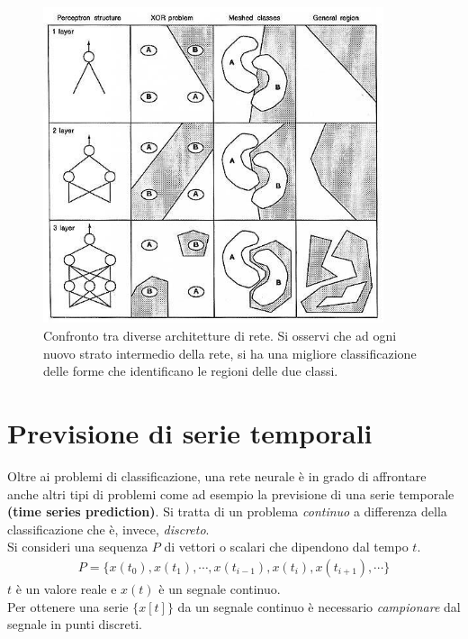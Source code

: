 \begin{figure}[h!]
	\centering
	\includegraphics[width=10cm]{images/layers}
	\caption[Confronto tra diverse architetture di rete]{Confronto tra diverse architetture di rete. Si osservi che ad ogni nuovo strato intermedio della rete, si ha una migliore classificazione delle forme che identificano le regioni delle due classi.}
\end{figure}



\section{Previsione di serie temporali} %
\label{sec:previsione_di_serie_temporali}
Oltre ai problemi di classificazione, una rete neurale è in grado di affrontare anche altri tipi di problemi come ad esempio la previsione di una serie temporale \textbf{(time series prediction)}. Si tratta di un problema \emph{continuo} a differenza della classificazione che è, invece, \emph{discreto}.\\

Si consideri una sequenza $P$ di vettori o scalari che dipendono dal tempo $t$.
\begin{align*}
	P = \{x(t_0), x(t_1), \cdots, x(t_{i - 1}), x(t_i), x(t_{i + 1}), \cdots\}
\end{align*}
$t$ è un valore reale e $x(t)$ è un segnale continuo.\\

Per ottenere una serie $\{x[t]\}$ da un segnale continuo è necessario \emph{campionare} dal segnale in punti discreti. 

